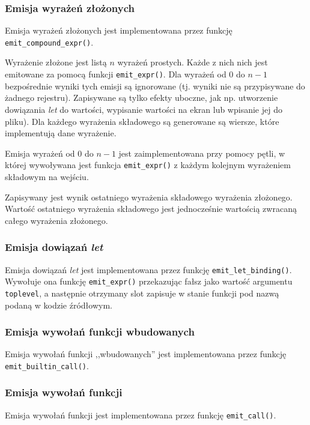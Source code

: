 \subsubsection{Emisja wyrażeń złożonych}

Emisja wyrażeń złożonych jest implementowana przez funkcję \texttt{emit\_compound\_expr()}.

Wyrażenie złożone jest listą $n$ wyrażeń prostych. Każde z nich nich jest
emitowane za pomocą funkcji \texttt{emit\_expr()}. Dla wyrażeń od $0$ do $n-1$
bezpośrednie wyniki tych emisji są ignorowane (tj. wyniki nie są przypisywane do
żadnego rejestru). Zapisywane są tylko efekty uboczne, jak np. utworzenie
dowiązania \emph{let} do wartości, wypisanie wartości na ekran lub wpisanie jej
do pliku). Dla każdego wyrażenia składowego są generowane są wiersze, które
implementują dane wyrażenie.

Emisja wyrażeń od $0$ do $n-1$ jest zaimplementowana przy pomocy pętli, w której
wywoływana jest funkcja \texttt{emit\_expr()} z każdym kolejnym wyrażeniem
składowym na wejściu.

Zapisywany jest wynik ostatniego wyrażenia składowego wyrażenia złożonego.
Wartość ostatniego wyrażenia składowego jest jednocześnie wartością zwracaną
całego wyrażenia złożonego.

\subsubsection{Emisja dowiązań \emph{let}}

Emisja dowiązań \emph{let} jest implementowana przez funkcję \texttt{emit\_let\_binding()}.
Wywołuje ona funkcję \texttt{emit\_expr()} przekazując fałsz jako wartość
argumentu \texttt{toplevel}, a następnie otrzymany slot zapisuje w stanie
funkcji pod nazwą podaną w kodzie źródłowym.

\subsubsection{Emisja wywołań funkcji wbudowanych}

Emisja wywołań funkcji ,,wbudowanych'' jest implementowana przez funkcję \texttt{emit\_builtin\_call()}.

\subsubsection{Emisja wywołań funkcji}

Emisja wywołań funkcji jest implementowana przez funkcję \texttt{emit\_call()}.

